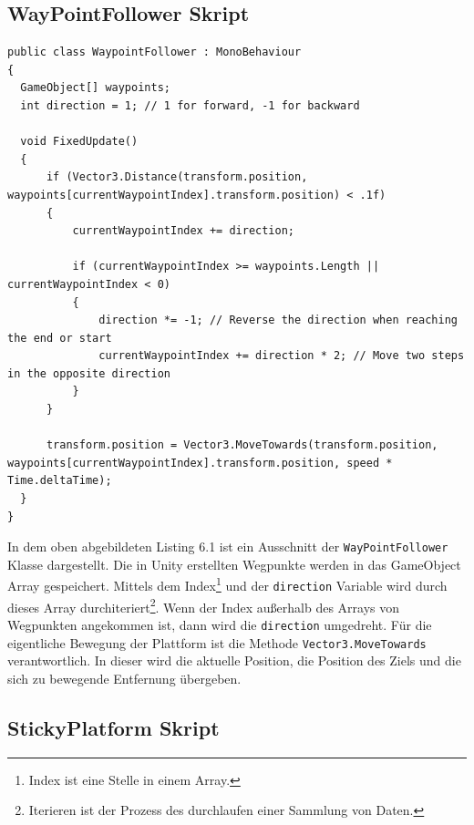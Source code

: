 \subsection{WayPointFollower Skript}

\begin{lstlisting}[language=CSharp,caption={FixedUpdate der WayPointFollower Klasse.},label=code:mainmenu]
public class WaypointFollower : MonoBehaviour
{
  GameObject[] waypoints;
  int direction = 1; // 1 for forward, -1 for backward

  void FixedUpdate()
  {
      if (Vector3.Distance(transform.position, waypoints[currentWaypointIndex].transform.position) < .1f)
      {
          currentWaypointIndex += direction;

          if (currentWaypointIndex >= waypoints.Length || currentWaypointIndex < 0)
          {
              direction *= -1; // Reverse the direction when reaching the end or start
              currentWaypointIndex += direction * 2; // Move two steps in the opposite direction
          }
      }

      transform.position = Vector3.MoveTowards(transform.position, waypoints[currentWaypointIndex].transform.position, speed * Time.deltaTime);
  }
}
\end{lstlisting}

In dem oben abgebildeten Listing 6.1 ist ein Ausschnitt der \verb+WayPointFollower+ Klasse dargestellt. Die in Unity erstellten Wegpunkte werden in das GameObject Array gespeichert. Mittels dem Index\footnote[1]{Index ist eine Stelle in einem Array.} und der \verb+direction+ Variable wird durch dieses Array durchiteriert\footnote[2]{Iterieren ist der Prozess des durchlaufen einer Sammlung von Daten.}. Wenn der Index außerhalb des Arrays von Wegpunkten angekommen ist, dann wird die \verb+direction+ umgedreht. Für die eigentliche Bewegung der Plattform ist die Methode \verb+Vector3.MoveTowards+ verantwortlich. In dieser wird die aktuelle Position, die Position des Ziels und die sich zu bewegende Entfernung übergeben.


\pagebreak

\subsection{StickyPlatform Skript}

